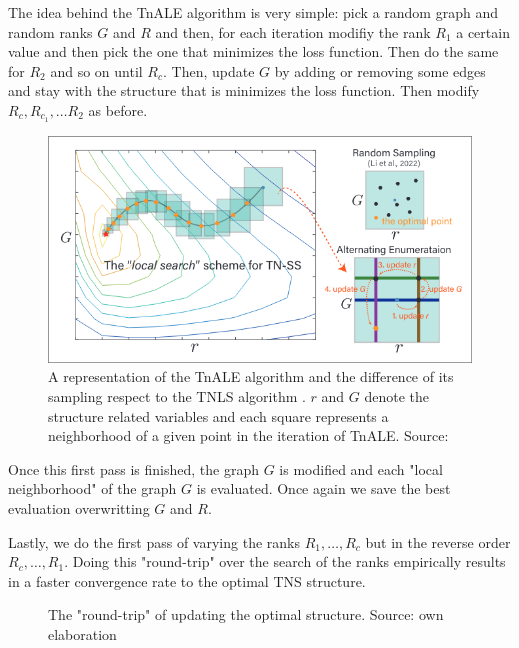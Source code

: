 \documentclass[11pt,a4paper,openright,oneside]{book}
\numberwithin{equation}{section}
\begin{document}
{The idea behind the TnALE algorithm is very simple: pick a random graph and random ranks $G$ and $R$ and then, for each iteration modifiy
the rank $R_1$ a certain value and then pick the one that minimizes the loss function. Then do the same
for $R_2$ and so on until $R_c$. Then, update $G$ by adding or removing some edges and stay with the structure that is minimizes the loss function.
Then modify $R_c, R_{c_1}, \dots R_2$ as before.

\begin{figure}[H]
    \centering
    \includegraphics[width=0.75\linewidth]{media/tnale-schema.png}
    \caption{A representation of the TnALE algorithm and the difference of its sampling respect to the \gls{TNLS} algorithm \cite{liPermutationSearchTensor2022}. $r$ and $G$
    denote the structure related variables and each square represents a neighborhood of a given point in the iteration of \gls{TnALE}. Source: \cite{liAlternatingLocalEnumeration2023}}
\end{figure}

Once this first pass is finished, the graph $G$ is modified and each "local neighborhood" of the graph $G$ is evaluated.
Once again we save the best evaluation overwritting $G$ and $R$.

Lastly, we do the first pass of varying the ranks $R_1, \dots, R_c$ but in the reverse order $R_c, \dots, R_1$.
Doing this "round-trip" over the search of the ranks empirically results in a faster convergence rate to the
optimal \gls{TNS} structure.

\begin{figure}[H]
    \centering
{}
\caption{The "round-trip" of updating the optimal structure. Source: own elaboration}
\end{figure}


}
\end{document}
